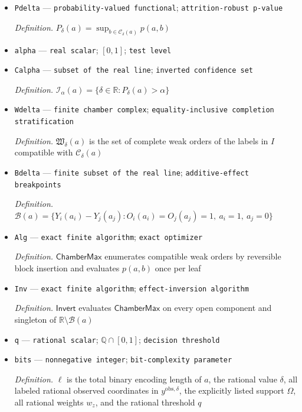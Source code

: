 \documentclass{article}
\begin{document}
\begin{itemize}
  \par\smallskip\noindent\emph{Definition.} \(p(a,b)=\sum_{z\in\Omega}w_z\mathbf 1\{T(z,b)\ge T(a,b)\}\)
  \item \texttt{Pdelta} --- \texttt{probability-\allowbreak{}valued functional}; \texttt{attrition-\allowbreak{}robust p-\allowbreak{}value}
  \par\smallskip\noindent\emph{Definition.} \(P_\delta(a)=\sup_{b\in\mathcal C_\delta(a)}p(a,b)\)
  \item \texttt{alpha} --- \texttt{real scalar}; \([0,1]\); \texttt{test level}
  \item \texttt{Calpha} --- \texttt{subset of the real line}; \texttt{inverted confidence set}
  \par\smallskip\noindent\emph{Definition.} \(\mathcal I_\alpha(a)=\{\delta\in\mathbb R:P_\delta(a)>\alpha\}\)
  \item \texttt{Wdelta} --- \texttt{finite chamber complex}; \texttt{equality-\allowbreak{}inclusive completion stratification}
  \par\smallskip\noindent\emph{Definition.} \(\mathfrak W_\delta(a)\) is the set of complete weak orders of the labels in \(I\) compatible with \(\mathcal C_\delta(a)\)
  \item \texttt{Bdelta} --- \texttt{finite subset of the real line}; \texttt{additive-\allowbreak{}effect breakpoints}
  \par\smallskip\noindent\emph{Definition.} \(\mathcal B(a)=\{Y_i(a_i)-Y_j(a_j):O_i(a_i)=O_j(a_j)=1,\ a_i=1,\ a_j=0\}\)
  \item \texttt{Alg} --- \texttt{exact finite algorithm}; \texttt{exact optimizer}
  \par\smallskip\noindent\emph{Definition.} \(\mathsf{ChamberMax}\) enumerates compatible weak orders by reversible block insertion and evaluates \(p(a,b)\) once per leaf
  \item \texttt{Inv} --- \texttt{exact finite algorithm}; \texttt{effect-\allowbreak{}inversion algorithm}
  \par\smallskip\noindent\emph{Definition.} \(\mathsf{Invert}\) evaluates \(\mathsf{ChamberMax}\) on every open component and singleton of \(\mathbb R\setminus\mathcal B(a)\)
  \item \texttt{q} --- \texttt{rational scalar}; \(\mathbb Q\cap[0,1]\); \texttt{decision threshold}
  \item \texttt{bits} --- \texttt{nonnegative integer}; \texttt{bit-\allowbreak{}complexity parameter}
  \par\smallskip\noindent\emph{Definition.} \(\ell\) is the total binary encoding length of \(a\), the rational value \(\delta\), all labeled rational observed coordinates in \(y^{\mathrm{obs},\delta}\), the explicitly listed support \(\Omega\), all rational weights \(w_z\), and the rational threshold \(q\)

\end{itemize}
\end{document}
